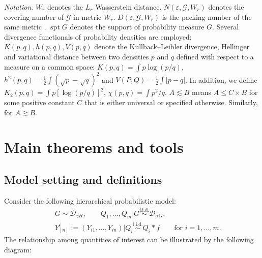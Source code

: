 \documentclass[MSNbibl,number,citesort]{arxbj}
\newcommand{\Gcal}{\mathscr{G}}
\newcommand{\supp}{\operatorname{spt}}
\newcommand{\DP}{\mathscr{D}}
\newcommand{\Wr}{W_r}
\newcommand{\YYn}{Y_{[n]}}
\begin{document}
\textit{Notation}.
$\Wr$ denotes the $L_r$ Wasserstein distance.
$N(\varepsilon, \Gcal, \Wr)$ denotes the covering number of $\Gcal$
in metric $\Wr$. $D(\varepsilon, \Gcal, \Wr)$ is the packing number of
the same metric \cite{vanderVaart-Wellner-96}.
$\supp G$ denotes the support of probability measure $G$.
Several divergence functionals of probability densities are employed:
$K(p,q), h(p,q), V(p,q)$ denote
the Kullback--Leibler divergence, Hellinger and variational distance
between two densities $p$ and $q$ defined with respect to a measure
on a common space: $K(p,q) = \int p\log(p/q) $,
$h^2(p,q) = \frac{1}{2}\int(\sqrt{p} - \sqrt{q})^2$
and $V(P,Q) = \frac{1}{2}\int|p -q|$.
In addition, we define $K_2(p,q) = \int p[\log(p /q)]^2$,
$\chi(p,q) = \int p^2/q$. $A \lesssim B$ means $A \leq C\times B$ for
some positive constant $C$ that is either universal or specified
otherwise.
Similarly, for $A \gtrsim B$.

\section{Main theorems and tools}
\label{Sec-descript}
\subsection{Model setting and definitions}
Consider the following hierarchical probabilistic model:
%
%
\begin{eqnarray}
\label{Eqn-HM-A}&& G \sim\DP_{\gamma H},\qquad Q_1,\ldots,
Q_m | G \stackrel{\mathrm{i.i.d.}} {\sim} \DP_{\alpha G},
\\
\label{Eqn-HM-B} &&\YYn^{i}:= (Y_{i1},\ldots,Y_{in})
| Q_i \stackrel{\mathrm{i.i.d.}} {\sim} Q_i*f \qquad\mbox{for } i=1,
\ldots, m.
\end{eqnarray}
%
The relationship among quantities of interest can be
illustrated by the following diagram:
%
\end{document}
